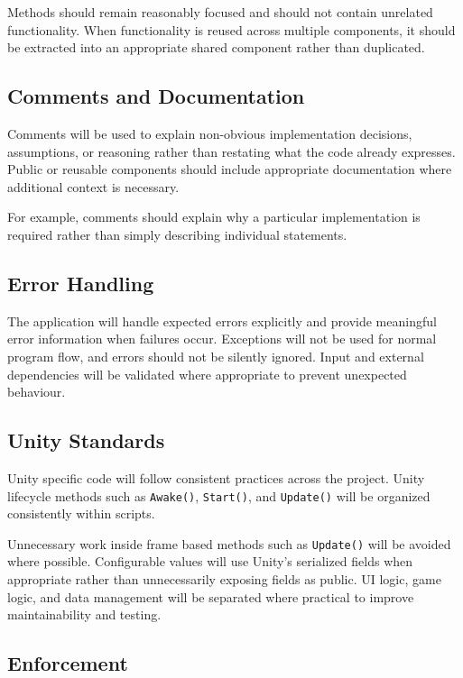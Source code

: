 \documentclass{article}
\begin{document}
Methods should remain reasonably focused and should not contain unrelated
functionality. When functionality is reused across multiple components,
it should be extracted into an appropriate shared component rather than
duplicated.


\subsection{Comments and Documentation}

Comments will be used to explain non-obvious implementation decisions,
assumptions, or reasoning rather than restating what the code already
expresses. Public or reusable components should include appropriate
documentation where additional context is necessary.

For example, comments should explain why a particular implementation is
required rather than simply describing individual statements.


\subsection{Error Handling}

The application will handle expected errors explicitly and provide
meaningful error information when failures occur. Exceptions will not be
used for normal program flow, and errors should not be silently ignored.
Input and external dependencies will be validated where appropriate to
prevent unexpected behaviour.


\subsection{Unity Standards}

Unity specific code will follow consistent practices across the project.
Unity lifecycle methods such as \texttt{Awake()}, \texttt{Start()}, and
\texttt{Update()} will be organized consistently within scripts.

Unnecessary work inside frame based methods such as \texttt{Update()} will
be avoided where possible. Configurable values will use Unity's serialized
fields when appropriate rather than unnecessarily exposing fields as
public. UI logic, game logic, and data management will be separated where
practical to improve maintainability and testing.


\subsection{Enforcement}
\end{document}
